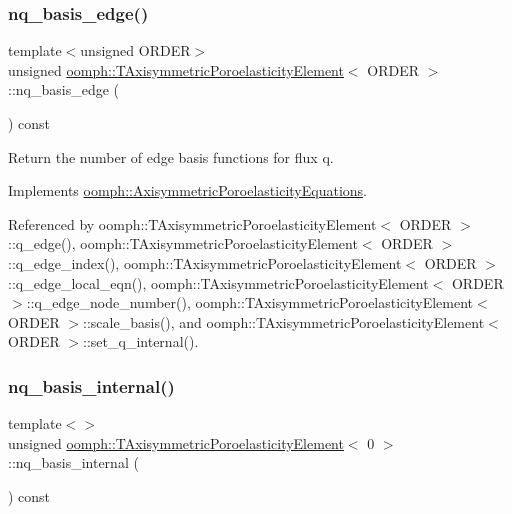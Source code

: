 \subsubsection{\texorpdfstring{nq\+\_\+basis\+\_\+edge()}{nq\_basis\_edge()}\hspace{0.1cm}{\footnotesize\ttfamily [3/3]}}
{\footnotesize\ttfamily template$<$unsigned O\+R\+D\+ER$>$ \\
unsigned \hyperlink{classoomph_1_1TAxisymmetricPoroelasticityElement}{oomph\+::\+T\+Axisymmetric\+Poroelasticity\+Element}$<$ O\+R\+D\+ER $>$\+::nq\+\_\+basis\+\_\+edge (\begin{DoxyParamCaption}{ }\end{DoxyParamCaption}) const\hspace{0.3cm}{\ttfamily [virtual]}}



Return the number of edge basis functions for flux q. 



Implements \hyperlink{classoomph_1_1AxisymmetricPoroelasticityEquations_aa5141d30c6dc0d4209ae043ddcea3d2e}{oomph\+::\+Axisymmetric\+Poroelasticity\+Equations}.



Referenced by oomph\+::\+T\+Axisymmetric\+Poroelasticity\+Element$<$ O\+R\+D\+E\+R $>$\+::q\+\_\+edge(), oomph\+::\+T\+Axisymmetric\+Poroelasticity\+Element$<$ O\+R\+D\+E\+R $>$\+::q\+\_\+edge\+\_\+index(), oomph\+::\+T\+Axisymmetric\+Poroelasticity\+Element$<$ O\+R\+D\+E\+R $>$\+::q\+\_\+edge\+\_\+local\+\_\+eqn(), oomph\+::\+T\+Axisymmetric\+Poroelasticity\+Element$<$ O\+R\+D\+E\+R $>$\+::q\+\_\+edge\+\_\+node\+\_\+number(), oomph\+::\+T\+Axisymmetric\+Poroelasticity\+Element$<$ O\+R\+D\+E\+R $>$\+::scale\+\_\+basis(), and oomph\+::\+T\+Axisymmetric\+Poroelasticity\+Element$<$ O\+R\+D\+E\+R $>$\+::set\+\_\+q\+\_\+internal().

\mbox{\label{classoomph_1_1TAxisymmetricPoroelasticityElement_a3044d14c97b11bc95560356dfb684a4b}} 
\subsubsection{\texorpdfstring{nq\+\_\+basis\+\_\+internal()}{nq\_basis\_internal()}\hspace{0.1cm}{\footnotesize\ttfamily [1/3]}}
{\footnotesize\ttfamily template$<$$>$ \\
unsigned \hyperlink{classoomph_1_1TAxisymmetricPoroelasticityElement}{oomph\+::\+T\+Axisymmetric\+Poroelasticity\+Element}$<$ 0 $>$\+::nq\+\_\+basis\+\_\+internal (\begin{DoxyParamCaption}{ }\end{DoxyParamCaption}) const\hspace{0.3cm}{\ttfamily [virtual]}}



